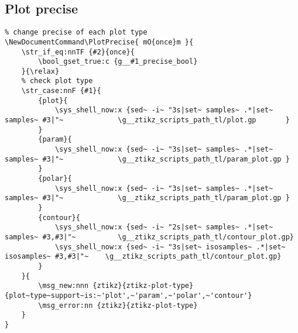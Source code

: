 \subsection{Plot precise}
\begin{verbatim}
% change precise of each plot type
\NewDocumentCommand\PlotPrecise{ mO{once}m }{
    \str_if_eq:nnTF {#2}{once}{
        \bool_gset_true:c {g__#1_precise_bool}
    }{\relax}
    % check plot type
    \str_case:nnF {#1}{
        {plot}{
            \sys_shell_now:x {sed~ -i~ "3s|set~ samples~ .*|set~ samples~ #3|"~             \g__ztikz_scripts_path_tl/plot.gp       }
        }
        {param}{
            \sys_shell_now:x {sed~ -i~ "3s|set~ samples~ .*|set~ samples~ #3|"~             \g__ztikz_scripts_path_tl/param_plot.gp }
        }
        {polar}{
            \sys_shell_now:x {sed~ -i~ "3s|set~ samples~ .*|set~ samples~ #3|"~             \g__ztikz_scripts_path_tl/param_plot.gp }
        }
        {contour}{
            \sys_shell_now:x {sed~ -i~ "2s|set~ samples~ .*|set~ samples~ #3,#3|"~          \g__ztikz_scripts_path_tl/contour_plot.gp}
            \sys_shell_now:x {sed~ -i~ "3s|set~ isosamples~ .*|set~ isosamples~ #3,#3|"~    \g__ztikz_scripts_path_tl/contour_plot.gp}
        }
    }{
        \msg_new:nnn {ztikz}{ztikz-plot-type}{plot~type~support~is:~'plot',~'param',~'polar',~'contour'}
        \msg_error:nn {ztikz}{ztikz-plot-type}
    }
}
\end{verbatim}

